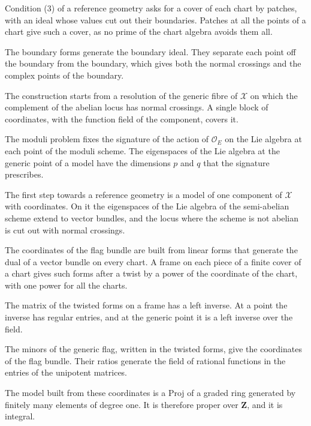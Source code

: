Condition (3) of a reference geometry asks for a cover of each chart by patches, with an ideal whose values cut out their
boundaries. Patches at all the points of a chart give such a cover, as no prime of the chart algebra avoids them all.

The boundary forms generate the boundary ideal. They separate each point off the boundary from the boundary, which gives both the
normal crossings and the complex points of the boundary.

The construction starts from a resolution of the generic fibre of $\mathcal X$ on which the complement of the abelian locus has
normal crossings. A single block of coordinates, with the function field of the component, covers it.

The moduli problem fixes the signature of the action of $\mathcal O_E$ on the Lie algebra at each point of the moduli scheme.
The eigenspaces of the Lie algebra at the generic point of a model have the dimensions $p$ and $q$ that the signature
prescribes.

The first step towards a reference geometry is a model of one component of $\mathcal X$ with coordinates. On it
the eigenspaces of the Lie algebra of the semi-abelian scheme extend to vector bundles, and the locus where the
scheme is not abelian is cut out with normal crossings.

The coordinates of the flag bundle are built from linear forms that generate the dual of a vector bundle on every chart. A frame on
each piece of a finite cover of a chart gives such forms after a twist by a power of the coordinate of the chart, with one power
for all the charts.

The matrix of the twisted forms on a frame has a left inverse. At a point the inverse has regular entries, and at the generic
point it is a left inverse over the field.

The minors of the generic flag, written in the twisted forms, give the coordinates of the flag bundle. Their ratios generate the
field of rational functions in the entries of the unipotent matrices.

The model built from these coordinates is a Proj of a graded ring generated by finitely many elements of degree one. It is therefore
proper over $\mathbf Z$, and it is integral.

